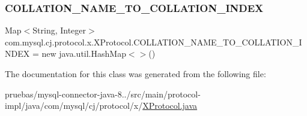 \subsubsection{\texorpdfstring{C\+O\+L\+L\+A\+T\+I\+O\+N\+\_\+\+N\+A\+M\+E\+\_\+\+T\+O\+\_\+\+C\+O\+L\+L\+A\+T\+I\+O\+N\+\_\+\+I\+N\+D\+EX}{COLLATION\_NAME\_TO\_COLLATION\_INDEX}}
{\footnotesize\ttfamily Map$<$String, Integer$>$ com.\+mysql.\+cj.\+protocol.\+x.\+X\+Protocol.\+C\+O\+L\+L\+A\+T\+I\+O\+N\+\_\+\+N\+A\+M\+E\+\_\+\+T\+O\+\_\+\+C\+O\+L\+L\+A\+T\+I\+O\+N\+\_\+\+I\+N\+D\+EX = new java.\+util.\+Hash\+Map$<$$>$()\hspace{0.3cm}{\ttfamily [static]}}



The documentation for this class was generated from the following file\+:\begin{DoxyCompactItemize}
\item 
pruebas/mysql-\/connector-\/java-\/8../src/main/protocol-\/impl/java/com/mysql/cj/protocol/x/\mbox{\hyperlink{_x_protocol_8java}{X\+Protocol.\+java}}\end{DoxyCompactItemize}
